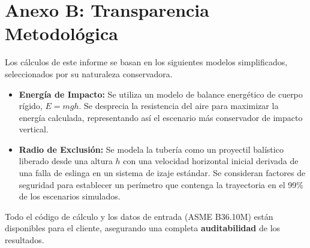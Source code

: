 \documentclass[11pt, a4paper, spanish]{article}
\begin{document}
\section*{Anexo B: Transparencia Metodológica}
Los cálculos de este informe se basan en los siguientes modelos simplificados, seleccionados por su naturaleza conservadora.
\begin{itemize}[leftmargin=*]
    \item \textbf{Energía de Impacto:} Se utiliza un modelo de balance energético de cuerpo rígido, \(E = mgh\). Se desprecia la resistencia del aire para maximizar la energía calculada, representando así el escenario más conservador de impacto vertical.
    \item \textbf{Radio de Exclusión:} Se modela la tubería como un proyectil balístico liberado desde una altura \(h\) con una velocidad horizontal inicial derivada de una falla de eslinga en un sistema de izaje estándar. Se consideran factores de seguridad para establecer un perímetro que contenga la trayectoria en el 99\% de los escenarios simulados.
\end{itemize}
Todo el código de cálculo y los datos de entrada (ASME B36.10M) están disponibles para el cliente, asegurando una completa \textbf{auditabilidad} de los resultados.
\end{document}
